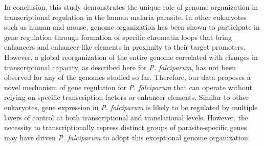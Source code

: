 In conclusion, this study demonstrates the unique role of genome organization in transcriptional regulation in the human malaria parasite. In other eukaryotes such as human and mouse, genome organization has been shown to participate in gene regulation through formation of specific chromatin loops that bring enhancers and enhancer-like elements in proximity to their target promoters. However, a global reorganization of the entire genome correlated with changes in transcriptional capacity, as described here for {\em P. falciparum}, has not been observed for any of the genomes studied so far. Therefore, our data proposes a novel mechanism of gene regulation for {\em P. falciparum} that can operate without relying on specific transcription factors or enhancer elements. Similar to other eukaryotes, gene expression in {\em P. falciparum} is likely to be regulated by multiple layers of control at both transcriptional and translational levels. However, the necessity to transcriptionally repress distinct groups of parasite-specific genes may have driven {\em P. falciparum} to adopt this exceptional genome organization.

